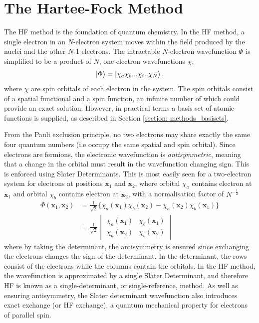 \section{The Hartee-Fock Method}\label{section: methods_HF}
The \acf{HF} method is the foundation of quantum chemistry. In the \ac{HF} method, a single electron in an $N$-electron system moves within the field produced by the nuclei and the other $N$-1 electrons.\cite{hartree_1928} The intractable $N$-electron wavefunction $\Phi$ is simplified to be a product of $N$, one-electron wavefunctions $\chi$,
\begin{equation}
\ket{\Phi}=\ket{\chi_{a}\chi_{b}...\chi_{i}..\chi_{N}}.
\end{equation}
where $\chi$ are spin orbitals of each electron in the system. The spin orbitals consist of a spatial functional and a spin function, an infinite number of which could provide an exact solution. However, in practical terms a basis set of atomic functions is supplied, as described in Section \ref{section: methods_basisets}.\cite{szabo1996}
 
 From the Pauli exclusion principle, no two electrons may share exactly the same four quantum numbers (i.e occupy the same spatial and spin orbital). Since electrons are fermions, the electronic wavefunction is \textit{antisymmetric}, meaning that a change in the orbital must result in the wavefunction changing sign. This is enforced using Slater Determinants.\cite{Slater1929} This is most easily seen for a two-electron system for electrons at positions $\bm{x}_{1}$ and $\bm{x}_{2}$, where orbital $\chi_{a}$ contains electron at $\bm{x}_1$ and orbital $\chi_{b}$ contains electron at $\bm{x}_2$, with a normalisation factor of $N^{-\frac{1}{2}}$
\begin{equation}
\begin{split}
\Phi(\bm{x}_{1},\bm{x}_{2})&=\frac{1}{\sqrt{2}}\{\chi_{a}(\bm{x}_{1})\chi_{b}(\bm{x}_{2})-\chi_{a}(\bm{x}_{2})\chi_{b}(\bm{x}_{1})\}\\
&=\frac{1}{\sqrt{2}}
\begin{vmatrix}
\chi_{a}(\bm{x}_{1})&\chi_{b}(\bm{x}_{1})\\
\chi_{a}(\bm{x}_{2})&\chi_{b}(\bm{x}_{2})
\end{vmatrix}
\end{split}
\end{equation}
where by taking the determinant, the antisymmetry is ensured since exchanging the electrons changes the sign of the determinant. In the determinant, the rows consist of the electrons while the columns contain the orbitals. In the \ac{HF} method, the wavefunction is approximated by a single Slater Determinant, and therefore \ac{HF} is known as a single-determinant, or single-reference, method.  As well as ensuring antisymmetry, the Slater determinant wavefunction also introduces exact exchange (or HF exchange), a quantum mechanical property for electrons of parallel spin.\cite{szabo1996}


